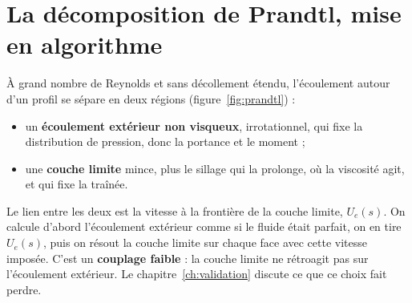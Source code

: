 \section{La décomposition de Prandtl, mise en algorithme}
À grand nombre de Reynolds et sans décollement étendu, l'écoulement autour d'un profil se sépare en deux régions (figure~\ref{fig:prandtl}) :
\begin{itemize}
\item un \textbf{écoulement extérieur non visqueux}, irrotationnel, qui fixe la distribution de pression, donc la portance et le moment ;
\item une \textbf{couche limite} mince, plus le sillage qui la prolonge, où la viscosité agit, et qui fixe la traînée.
\end{itemize}
Le lien entre les deux est la vitesse à la frontière de la couche limite, $U_e(s)$. On calcule d'abord l'écoulement extérieur comme si le fluide était parfait, on en tire $U_e(s)$, puis on résout la couche limite sur chaque face avec cette vitesse imposée. C'est un \textbf{couplage faible} : la couche limite ne rétroagit pas sur l'écoulement extérieur. Le chapitre~\ref{ch:validation} discute ce que ce choix fait perdre.


